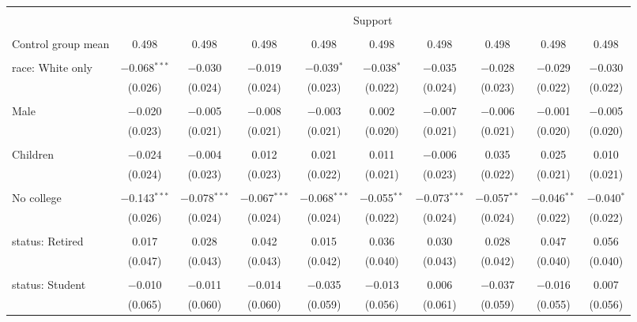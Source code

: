 
\begin{tabular}{@{\extracolsep{5pt}}lccccccccc} 
\\[-1.8ex]\hline 
\hline \\[-1.8ex] 
 & \multicolumn{9}{c}{Support} \\ 
\cline{2-10} 
\hline \\[-1.8ex] 
 Control group mean & 0.498 & 0.498 & 0.498 & 0.498 & 0.498 & 0.498 & 0.498 & 0.498 & 0.498  \\ \hline \\[-1.8ex] race: White only & $-$0.068$^{***}$ & $-$0.030 & $-$0.019 & $-$0.039$^{*}$ & $-$0.038$^{*}$ & $-$0.035 & $-$0.028 & $-$0.029 & $-$0.030 \\ 
  & (0.026) & (0.024) & (0.024) & (0.023) & (0.022) & (0.024) & (0.023) & (0.022) & (0.022) \\ 
  & & & & & & & & & \\ 
 Male & $-$0.020 & $-$0.005 & $-$0.008 & $-$0.003 & 0.002 & $-$0.007 & $-$0.006 & $-$0.001 & $-$0.005 \\ 
  & (0.023) & (0.021) & (0.021) & (0.021) & (0.020) & (0.021) & (0.021) & (0.020) & (0.020) \\ 
  & & & & & & & & & \\ 
 Children & $-$0.024 & $-$0.004 & 0.012 & 0.021 & 0.011 & $-$0.006 & 0.035 & 0.025 & 0.010 \\ 
  & (0.024) & (0.023) & (0.023) & (0.022) & (0.021) & (0.023) & (0.022) & (0.021) & (0.021) \\ 
  & & & & & & & & & \\ 
 No college & $-$0.143$^{***}$ & $-$0.078$^{***}$ & $-$0.067$^{***}$ & $-$0.068$^{***}$ & $-$0.055$^{**}$ & $-$0.073$^{***}$ & $-$0.057$^{**}$ & $-$0.046$^{**}$ & $-$0.040$^{*}$ \\ 
  & (0.026) & (0.024) & (0.024) & (0.024) & (0.022) & (0.024) & (0.024) & (0.022) & (0.022) \\ 
  & & & & & & & & & \\ 
 status: Retired & 0.017 & 0.028 & 0.042 & 0.015 & 0.036 & 0.030 & 0.028 & 0.047 & 0.056 \\ 
  & (0.047) & (0.043) & (0.043) & (0.042) & (0.040) & (0.043) & (0.042) & (0.040) & (0.040) \\ 
  & & & & & & & & & \\ 
 status: Student & $-$0.010 & $-$0.011 & $-$0.014 & $-$0.035 & $-$0.013 & 0.006 & $-$0.037 & $-$0.016 & 0.007 \\ 
  & (0.065) & (0.060) & (0.060) & (0.059) & (0.056) & (0.061) & (0.059) & (0.055) & (0.056) \\ 

\end{tabular}
